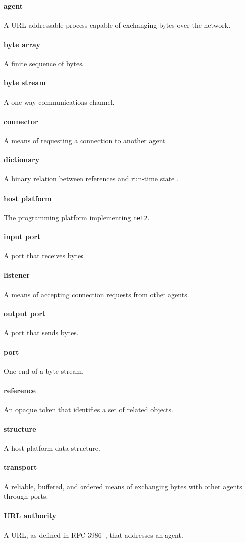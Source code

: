 \documentclass[letterpaper,12pt,openany]{report}
\newcommand{\NetTwo}{\texttt{net2}}
\begin{document}
\appendix


\newcommand{\GlossaryItem}[2]{
  \noindent
  \paragraph{#1} #2\vspace{-1ex}
}

\GlossaryItem{agent}{A URL-addressable process capable of exchanging bytes
  over the network.}

\GlossaryItem{byte array}{A finite sequence of bytes.}

\GlossaryItem{byte stream}{A one-way communications channel.}

\GlossaryItem{connector}{A means of requesting a connection to another agent.}

\GlossaryItem{dictionary}{A binary relation between references and run-time
  state}.

\GlossaryItem{host platform}{The programming platform implementing {\NetTwo}.}

\GlossaryItem{input port}{A port that receives bytes.}

\GlossaryItem{listener}{A means of accepting connection requests from other
  agents.}

\GlossaryItem{output port}{A port that sends bytes.}

\GlossaryItem{port}{One end of a byte stream.}

\GlossaryItem{reference}{An opaque token that identifies a set of related
  objects.}

\GlossaryItem{structure}{A host platform data structure.}

\GlossaryItem{transport}{A reliable, buffered, and ordered means of exchanging
  bytes with other agents through ports.}

\GlossaryItem{URL authority}{A URL, as defined in RFC
  3986~\cite{berners2014rfc}, that addresses an agent.}


 


\end{document}
